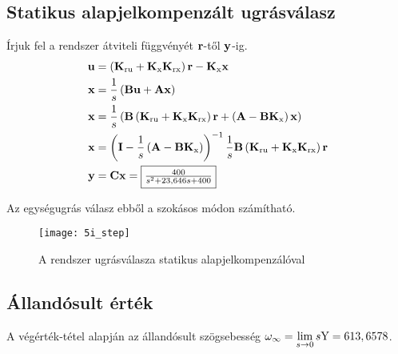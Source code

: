 
\subsection{Statikus alapjelkompenzált ugrásválasz}

Írjuk fel a rendszer átviteli függvényét $\B{r}$-től $\B{y}$-ig.
\begin{align}
	\B{u} &= \brc{\B{K}_\text{ru}+\B{K}_\text{x}\B{K}_\text{rx}}\B{r} - \B{K}_\text{x}\B{x}\\
	\B{x} &= \frac{1}{s}\brc{\B{B}\B{u} + \B{A}\B{x}}\\
	\B{x} &= \frac{1}{s}\brc{\B{B}\brc{\B{K}_\text{ru}+\B{K}_\text{x}\B{K}_\text{rx}}\B{r}+\brc{\B{A}-\B{B}\B{K}_\text{x}}\B{x}}\\
	\B{x} &= \brc{\B{I}-\frac{1}{s}\brc{\B{A}-\B{B}\B{K}_\text{x} }}^{-1}\frac{1}{s}\B{B}\brc{\B{K}_\text{ru}+\B{K}_\text{x}\B{K}_\text{rx}}\B{r}\\
	\B{y} &= \B{C}\B{x} = \fbox{$\frac{400}{s^2 + 23,646 s + 400}$}
\end{align}

Az egységugrás válasz ebből a szokásos módon számítható.
\begin{figure}[H]
	\centering
	\texttt{[image: 5i\_step]}
	\caption{A rendszer ugrásválasza statikus alapjelkompenzálóval}
	\label{fig:5i_step}
\end{figure}


\subsection{Állandósult érték}

A végérték-tétel alapján az állandósult szögsebesség $\omega_\infty = \lim\limits_{s\rightarrow 0}s\fn{Y} = 613,6578$.

